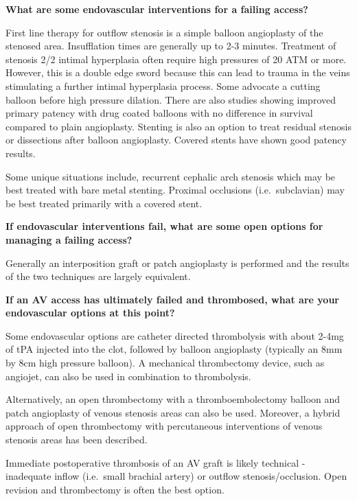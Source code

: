 \documentclass[
]{book}
\begin{document}
\textbf{What are some endovascular interventions for a failing access?}

First line therapy for outflow stenosis is a simple balloon angioplasty
of the stenosed area.\citep{berman2001} Insufflation times are generally up
to 2-3 minutes. Treatment of stenosis 2/2 intimal hyperplasia often
require high pressures of 20 ATM or more. However, this is a double edge
sword because this can lead to trauma in the veins stimulating a further
intimal hyperplasia process. Some advocate a cutting balloon before high
pressure dilation. There are also studies showing improved primary
patency with drug coated balloons with no difference in survival
compared to plain angioplasty.\citep{han2017, chen2020, moreno-sánchez2020, yin2021} Stenting is also an option to treat residual stenosis or
dissections after balloon angioplasty. Covered stents have shown good
patency results.

Some unique situations include, recurrent cephalic arch stenosis which
may be best treated with bare metal stenting.\citep{shemesh2008} Proximal
occlusions (i.e.~subclavian) may be best treated primarily with a
covered stent.\citep{agarwal2015, anaya-ayala2011}

\textbf{If endovascular interventions fail, what are some open options for
managing a failing access?}

Generally an interposition graft or patch angioplasty is performed and
the results of the two techniques are largely equivalent.

\textbf{If an AV access has ultimately failed and thrombosed, what are your
endovascular options at this point?}

Some endovascular options are catheter directed thrombolysis with about
2-4mg of tPA injected into the clot, followed by balloon angioplasty
(typically an 8mm by 8cm high pressure balloon). A mechanical
thrombectomy device, such as angiojet, can also be used in combination
to thrombolysis.

Alternatively, an open thrombectomy with a thromboembolectomy balloon
and patch angioplasty of venous stenosis areas can also be used.
Moreover, a hybrid approach of open thrombectomy with percutaneous
interventions of venous stenosis areas has been described.

Immediate postoperative thrombosis of an AV graft is likely technical -
inadequate inflow (i.e.~small brachial artery) or outflow
stenosis/occlusion. Open revision and thrombectomy is often the best
option.\citep{paulson2002}
\end{document}
